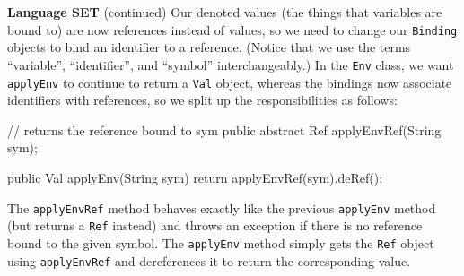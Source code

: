 \begin{minipage}[t]{\sw}
\slidenumber
\LARGE
{\bf Language SET} (continued)\exx
Our denoted values (the things that variables are bound to)
are now references instead of values,
so we need to change our \verb'Binding' objects
to bind an identifier to a reference.
(Notice that we use the terms ``variable'', ``identifier'', and ``symbol''
interchangeably.)\exx
{\Large\emm{}}\exx
In the \verb'Env' class,
we want \verb'applyEnv' to continue
to return a \verb'Val' object,
whereas the bindings now associate identifiers with references,
so we split up the responsibilities as follows:
{\Large
\begin{qv}
// returns the reference bound to sym
public abstract Ref applyEnvRef(String sym);

public Val applyEnv(String sym) {
    return applyEnvRef(sym).deRef();
}
\end{qv}
}
The \verb'applyEnvRef' method behaves exactly like the previous
\verb'applyEnv' method (but returns a \verb'Ref' instead)
and throws an exception if there is no reference bound
to the given symbol.
The \verb'applyEnv' method simply gets the \verb'Ref' object
using \verb'applyEnvRef' and dereferences it
to return the corresponding value.
\end{minipage}
\clearpage
